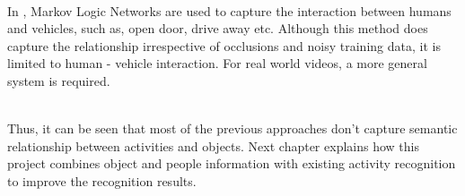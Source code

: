 ~\\
In \cite{Parking}, Markov Logic Networks are used to capture the interaction
between humans and vehicles, such as, open door, drive away etc. 
Although this method does capture the relationship irrespective of occlusions
and noisy training data, it is limited to human - vehicle interaction.
For real world videos, a more general system is required.

~\\
Thus, it can be seen that most of the previous approaches don't capture semantic relationship between activities and objects.
Next chapter explains how this project combines object and people information
with existing activity recognition to improve the recognition results.

